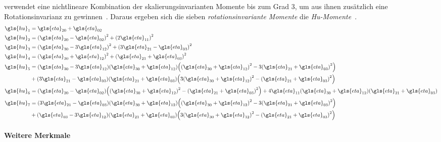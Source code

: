 \citeauthor{Hu} verwendet eine nichtlineare Kombination der skalierungsinvarianten Momente bis zum Grad $3$, um aus ihnen zusätzlich eine Rotationsinvarianz zu gewinnen~\cite{Hu, momente}.
Daraus ergeben sich die sieben \emph{rotationsinvariante Momente} \bzw{} die \emph{Hu-Momente}~\cite{momente}.
\begin{equation*}
\begin{split}
  \gls{hu}_1 & = \gls{eta}_{20} + \gls{eta}_{02}\\
  \gls{hu}_2 & = {\left(\gls{eta}_{20} - \gls{eta}_{02}\right)}^2 + {\left(2\gls{eta}_{11}\right)}^2\\
  \gls{hu}_3 & = {\left(\gls{eta}_{30} - 3\gls{eta}_{12}\right)}^2 + {\left(3\gls{eta}_{21} - \gls{eta}_{03}\right)}^2\\
  \gls{hu}_4 & = {\left(\gls{eta}_{30} + \gls{eta}_{12}\right)}^2 + {\left(\gls{eta}_{21} + \gls{eta}_{03}\right)}^2\\
  \gls{hu}_5 & = \left(\gls{eta}_{30} - 3\gls{eta}_{12}\right)\left(\gls{eta}_{30} + \gls{eta}_{12}\right) \left({\left(\gls{eta}_{30} + \gls{eta}_{12}\right)}^2 - 3{\left(\gls{eta}_{21} + \gls{eta}_{03}\right)}^2\right)\\
  & + \left(3\gls{eta}_{21} - \gls{eta}_{03}\right)\left(\gls{eta}_{21} + \gls{eta}_{03}\right) \left(3{\left(\gls{eta}_{30} + \gls{eta}_{12}\right)}^2 - {\left(\gls{eta}_{21} + \gls{eta}_{03}\right)}^2\right)\\
  \gls{hu}_6 & = \left(\gls{eta}_{20} - \gls{eta}_{02}\right)\left({\left(\gls{eta}_{30} + \gls{eta}_{12}\right)}^2 - {\left(\gls{eta}_{21} + \gls{eta}_{03}\right)}^2\right) + 4\gls{eta}_{11}\left(\gls{eta}_{30} + \gls{eta}_{12}\right)\left(\gls{eta}_{21} + \gls{eta}_{03}\right)\\
  \gls{hu}_7 & = \left(3\gls{eta}_{21} - \gls{eta}_{03}\right)\left(\gls{eta}_{30} + \gls{eta}_{12}\right) \left({\left(\gls{eta}_{30} + \gls{eta}_{12}\right)}^2 - 3{\left(\gls{eta}_{21} + \gls{eta}_{03}\right)}^2\right)\\
  & + \left(\gls{eta}_{03} - 3\gls{eta}_{12}\right)\left(\gls{eta}_{21} + \gls{eta}_{03}\right) \left(3{\left(\gls{eta}_{30} + \gls{eta}_{12}\right)}^2 - {\left(\gls{eta}_{21} + \gls{eta}_{03}\right)}^2\right)
\end{split}
\end{equation*}

\paragraph{Weitere Merkmale}
\label{weitere_merkmale}

